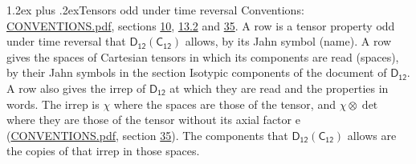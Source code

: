 \documentclass[10pt,a4paper]{article}
\makeatletter
\renewcommand\section{\@startsection{section}{1}{\z@}{-3ex plus -1ex minus -.2ex}%
  {1.2ex plus .2ex}{\normalfont\large\sffamily\bfseries\color{parttitle}}}
\numberwithin{equation}{section}
\newcommand{\grp}[1]{\mathsf{#1}}
\newcommand{\irrprod}{\otimes}
\makeatother
\begin{document}
\section{Tensors odd under time reversal}\label{s:time_odd}
Conventions: \href{../../CONVENTIONS.pdf}{CONVENTIONS.pdf}, sections \href{../../../rotation/CONVENTIONS.pdf\#conv.10}{10}, \href{../../../rotation/CONVENTIONS.pdf\#conv.13.2}{13.2} and \href{../../CONVENTIONS.pdf\#conv.35}{35}.
\leavevmode\label{n:head.name.property}A row is a tensor property odd under time reversal that $\grp{D_{12}}(\grp{C_{12}})$ allows, by its Jahn symbol (name). \label{n:head.spaces}A row gives the spaces of Cartesian tensors in which its components are read (spaces), by their Jahn symbols in the section Isotypic components of the document of \href{../../../rotation/data/pdf/D12.pdf}{$\grp{D_{12}}$}. \label{n:head.properties}A row also gives the irrep of $\grp{D_{12}}$ at which they are read and the properties in words. The irrep is $\chi$ where the spaces are those of the tensor, and $\chi \irrprod \det$ where they are those of the tensor without its axial factor e (\href{../../CONVENTIONS.pdf}{CONVENTIONS.pdf}, section \href{../../CONVENTIONS.pdf\#conv.35}{35}). The components that $\grp{D_{12}}(\grp{C_{12}})$ allows are the copies of that irrep in those spaces.
\end{document}
